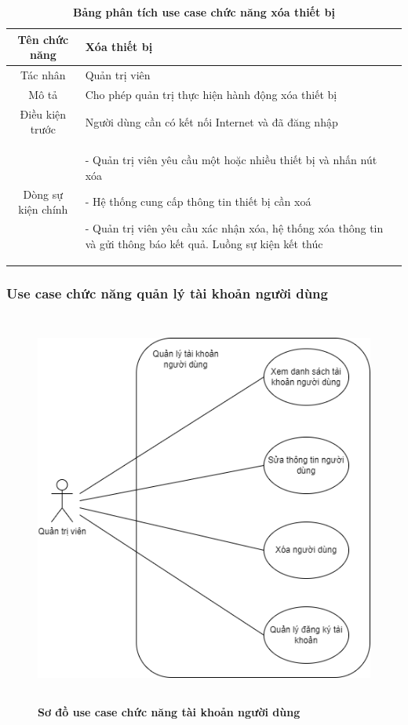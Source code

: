   \begin{table}[H]
    \caption{\bfseries \fontsize{12pt}{0pt}\selectfont Bảng phân tích use case chức năng xóa thiết bị}
    \centering
    \begin{tabularx}{0.9\textwidth}{|c|X|}
      \hline
      \textbf{Tên chức năng} & \textbf{Xóa thiết bị} \\
      \hline
      Tác nhân & Quản trị viên \\
      \hline
      Mô tả & Cho phép quản trị thực hiện hành động xóa thiết bị \\
      \hline
      Điều kiện trước & Người dùng cần có kết nối Internet và đã đăng nhập \\
      \hline
      Dòng sự kiện chính & 
        - Quản trị viên yêu cầu một hoặc nhiều thiết bị và nhấn nút xóa

        - Hệ thống cung cấp thông tin thiết bị cần xoá

        - Quản trị viên yêu cầu xác nhận xóa, hệ thống xóa thông tin và gửi thông báo kết quả. Luồng sự kiện kết thúc
        \\
      \hline
    \end{tabularx}
  \end{table}
  
\subsubsection{Use case chức năng quản lý tài khoản người dùng}
  \begin{figure}[H]
    \centering
    \includegraphics[width=12cm,height=13cm]{Images/use_case/use_case_manage_users.png}
    \caption[Sơ đồ use case chức năng tài khoản người dùng]{\bfseries \fontsize{12pt}{0pt}
    \selectfont Sơ đồ use case chức năng tài khoản người dùng}
    \label{use_case_user_management} %
  \end{figure}

